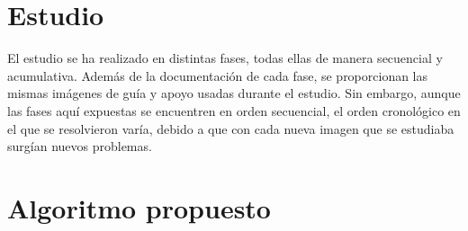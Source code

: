 \section{Estudio}
El estudio se ha realizado en distintas fases, todas ellas de manera
secuencial y acumulativa. Además de la documentación de cada fase, se
proporcionan las mismas imágenes de guía y apoyo usadas durante el estudio.
Sin embargo, aunque las fases aquí expuestas se encuentren en orden 
secuencial, el orden cronológico en el que se resolvieron varía,
debido a que con cada nueva imagen que se estudiaba surgían nuevos 
problemas.
\section{Algoritmo propuesto}
